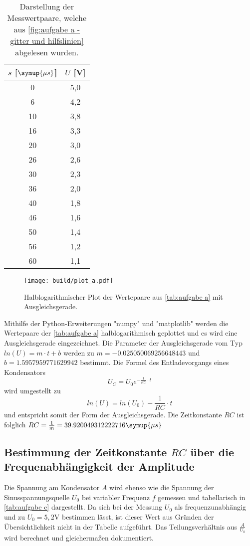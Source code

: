 \begin{table}
  \centering
  \caption{Darstellung der Messwertpaare, welche aus \autoref{fig:aufgabe a - gitter und hilfslinien} abgelesen wurden.}
  \label{tab:aufgabe a}
  \begin{tabular}{S[table-format=2.0] S[table-format=1.1]}
    \toprule
    {$s$ [$\symup{\mu s}$]} & {$U$ [V]} \\
     &  5,0 \\
    6	&  4,2 \\
    10 & 3,8 \\
    16 & 3,3 \\
    20 & 3,0 \\
    26 & 2,6 \\
    30 & 2,3 \\
    36 & 2,0 \\
    40 & 1,8 \\
    46 & 1,6 \\
    50 & 1,4 \\
    56 & 1,2 \\
    60 & 1,1 \\
    \bottomrule
  \end{tabular}
\end{table}

\begin{figure}
  \centering
  \texttt{[image: build/plot\_a.pdf]}
  \caption{Halblogarithmischer Plot der Wertepaare aus \autoref{tab:aufgabe a} %
  mit Ausgleichsgerade.}
  \label{fig:plot_a}
\end{figure}

Mithilfe der Python-Erweiterungen "numpy" \cite{numpy} und "matplotlib" \cite{matplotlib} werden die Wertepaare der 
\autoref{tab:aufgabe a} halblogarithmisch geplottet und es wird eine Ausgleichsgerade eingezeichnet. Die Parameter der
Ausgleichsgerade vom Typ $ln(U) = m \cdot t + b$ werden zu $m=−0.025050069256648443$ und $b=1.5957959771629942$ bestimmt.
Die Formel des Entladevorgangs eines Kondensators
\begin{equation}
  U_{C} = U_{0}e^{-\frac{1}{RC}\cdot t}
\end{equation}
wird umgestellt zu
\begin{equation}
  ln(U) = ln(U_{0})-\frac{1}{RC}\cdot t
\end{equation}
und entspricht somit der Form der Ausgleichsgerade. Die Zeitkonstante $RC$ ist folglich 
$RC = \frac{1}{m} = 39.920049312222716 \symup{\mu s}$



\subsection{Bestimmung der Zeitkonstante $RC$ über die Frequenabhängigkeit der Amplitude}
Die Spannung am Kondensator $A$ wird ebenso wie die Spannung der Sinusspannungsquelle $U_{0}$ bei variabler
Frequenz $f$ gemessen und tabellarisch in \autoref{tab:aufgabe c} dargestellt. Da sich bei der Messung $U_{0}$
als frequenzunabhängig und zu $U_{0} = 5,2$V bestimmen lässt, ist dieser Wert aus Gründen der
Übersichtlichkeit nicht in der Tabelle aufgeführt. Das Teilungsverhältnis aus $\frac{A}{U_{0}}$ wird berechnet und
gleichermaßen dokumentiert. 

